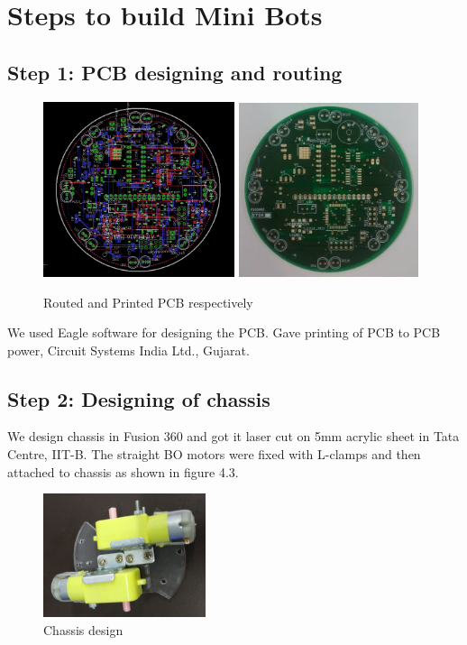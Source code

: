 \documentclass[a4paper,12pt,oneside]{book}
\begin{document}
\section{Steps to build Mini Bots}
\subsection*{Step 1: PCB designing and routing}
\begin{figure}[h!]
	\includegraphics[width=0.5\textwidth]{./PCB_layout}
	\includegraphics[width=0.47\textwidth]{./Pictures/PCB_front}		
	\caption{Routed and Printed PCB respectively}
\end{figure}	
We used Eagle software for designing the PCB. Gave printing of PCB to PCB power, Circuit Systems India Ltd., Gujarat.
\subsection*{Step 2: Designing of chassis}
We design chassis in Fusion 360 and got it laser cut on 5mm acrylic sheet in Tata Centre, IIT-B. The straight BO motors were fixed with L-clamps and then attached to chassis as shown in figure 4.3. 
\begin{figure}[h!]
	\centering\includegraphics[width=180px]{./Pictures/Chassis_Design}		
	\caption{Chassis design}
\end{figure}	
       
\end{document}
